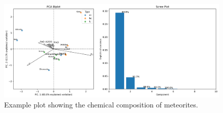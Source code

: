 
\begin{figure}[htbp]
    \centering
    \includegraphics[width=1.0\textwidth]{figures/pca_biplot.png}
    \caption{Example plot showing the chemical composition of meteorites.}
    \label{fig:pcabiplot}
\end{figure}
